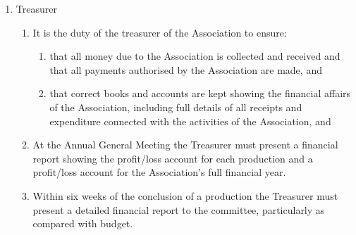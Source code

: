 \documentclass{article}
\begin{document}
\begin{enumerate}
\begin{enumerate}
    \end{enumerate}
  \item Treasurer
    \begin{enumerate}
      \item It is the duty of the treasurer of the Association to ensure:
        \begin{enumerate}
          \item that all money due to the Association is collected and received and that all payments authorised by the Association are made, and
          \item that correct books and accounts are kept showing the financial affairs of the Association, including full details of all receipts and expenditure connected with the activities of the Association, and
        \end{enumerate}
      \item At the Annual General Meeting the Treasurer must present a financial report showing the profit/loss account for each production and a profit/loss account for the Association’s full financial year.
      \item Within six weeks of the conclusion of a production the Treasurer must present a detailed financial report to the committee, particularly as compared with budget.
    \end{enumerate}
\end{enumerate}
\end{document}
